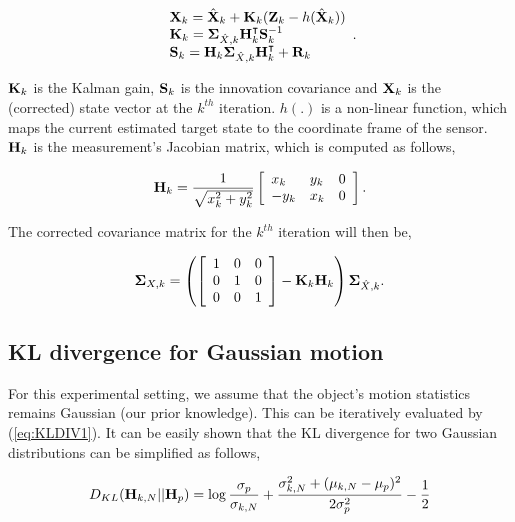 \begin{equation}
\begin{array}{l}
{\bf X}_{k} = \hat{{\bf X}}_k + {\bf K}_k ({\bf Z}_k - h(\hat{{\bf X}}_k)) \\
{\bf K}_k = {\bf \Sigma}_{\hat{X}, k} {\bf H}_k^\intercal {\bf S}_k^{-1} \\
{\bf S}_k = {\bf H}_k {\bf \Sigma}_{\hat{X}, k} {\bf H}_k^\intercal + {\bf R}_k
\end{array}.
\end{equation}

\noindent ${\bf K}_k$ is the Kalman gain, ${\bf S}_k$ is the innovation covariance and ${\bf X}_{k}$ is the (corrected) state vector at the $k^{th}$ iteration. $h(.)$ is a non-linear function, which maps the current estimated target state to the coordinate frame of the sensor. ${\bf H}_k$ is the measurement's Jacobian matrix, which is computed as follows,

\begin{equation} 
{\bf H}_k = 
\frac{1}{\sqrt{x_k^2 + y_k^2}}
\left[
\begin{array}{lll}
x_k & y_k & 0 \\
-y_k & x_k & 0
\end{array}
\right].
\end{equation}

\noindent The corrected covariance matrix for the $k^{th}$ iteration will then be,

\begin{equation}
{\bf \Sigma}_{X, k} = 
\left(
\left[
\begin{array}{lll}
1 & 0 & 0 \\ 
0 & 1 & 0 \\
0 & 0 & 1 
\end{array}
\right]
- {\bf K}_k {\bf H}_k
\right)
{\bf \Sigma}_{\hat{X}, k}.
\label{eq:correctCOV}
\end{equation}

\subsection{KL divergence for Gaussian motion}
For this experimental setting, we assume that the object's motion statistics remains Gaussian (our prior knowledge). This can be iteratively evaluated by (\ref{eq:KLDIV1}). It can be easily shown that the KL divergence for two Gaussian distributions can be simplified as follows,

\begin{equation}
D_{KL}({\bf H}_{k, N} || {\bf H}_{p}) = \log{\frac{\sigma_p}{\sigma_{k, N}}} + \frac{\sigma_{k, N}^2 + (\mu_{k, N} - \mu_p)^2}{2\sigma_p^2} - \frac{1}{2}
\label{eq:KLDIV2}
\end{equation}

